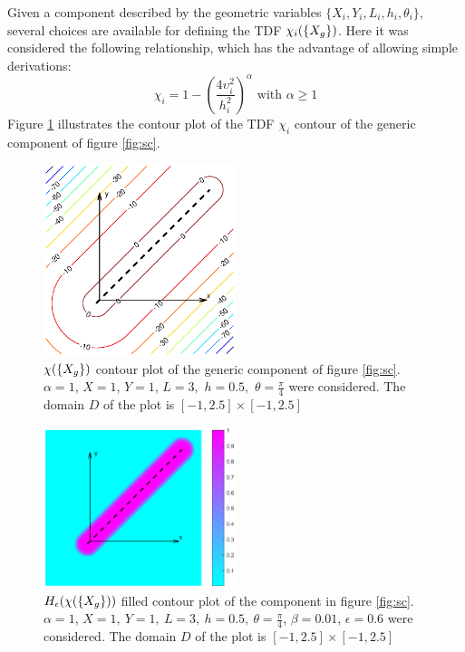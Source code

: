 Given a component described by the geometric variables $\lbrace X_i,Y_i,L_i,h_i,\theta_i\rbrace$, several choices are available for defining the TDF $\chi_i(\left\{{X_g}\right\})$. Here it was considered the following relationship, which has the advantage of allowing simple derivations:
\begin{equation}
\label{eq:chi}
    \chi_i=1-\left(\frac{4\upsilon_i^2}{h_i^2}\right)^\alpha \text{ with } \alpha\geq 1 
\end{equation}
Figure \ref{fig:3} illustrates the contour plot of the TDF $\chi_i$ contour of the generic component of figure \ref{fig:sc}. 
\begin{figure}[!ht]
\centering
  \includegraphics[width=0.5\textwidth]{images/Ch3/Chi_example.eps}
\caption{$\chi(\left\{{X_g}\right\})$ contour plot of the generic component of figure \ref{fig:sc}. $\alpha=1$, $X=1$, $Y=1$, $L=3,$ $h=0.5,$ $\theta=\frac{\pi}{4}$ were considered. The domain $D$ of the plot is $[-1,2.5]\times[-1,2.5]$}
\label{fig:3}       %
\end{figure}
\begin{figure}[!ht]
\centering
  \includegraphics[width=0.5\textwidth]{images/Ch3/H_epsi_bet.eps}
\caption{$H_{\epsilon}(\chi(\left\{{X_g}\right\}))$ filled contour plot of the component in figure \ref{fig:sc}.  $\alpha=1$, $X=1,\ Y=1,\ L=3,\ h=0.5,\ \theta=\frac{\pi}{4}$, $\beta=0.01$, $\epsilon=0.6$ were considered. The domain $D$ of the plot is $[-1,2.5]\times[-1,2.5]$}
\label{fig:H}       %
\end{figure}

